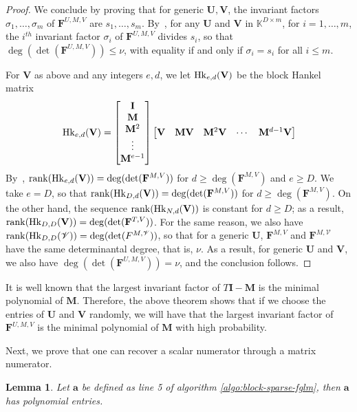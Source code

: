 \documentclass[12pt]{article}
\newtheorem{Lemma}{Lemma}
\def\K {\ensuremath{\mathbb{K}}}
\def\scrV {\ensuremath{\mathscr{V}}}
\def\K{\mathbb{K}}
\def\mF{\mathbf{F}}
\def\mI{\mathbf{I}}
\def\mM{\mathbf{M}}
\def\mU{\mathbf{U}}
\def\mV{\mathbf{V}}
\begin{document}
\begin{proof}
	We conclude by proving that for generic $\mU,\mV$, the invariant factors
	$\sigma_1,\dots,\sigma_m$ of $\mF^{U,M,V}$ are $s_1,\dots,s_m$.
	By~\cite[Theorem~2.12]{KaVi04}, for any $\mU$ and $\mV$ in $\K^{D\times
		m}$, for $i=1,\dots,m$, the $i^{th}$ invariant factor $\sigma_i$ of
	$\mF^{U,M,V}$ divides $s_i$, so that $\deg(\det(\mF^{U,M,V}))\le\nu$, with
	equality if and only if $\sigma_i=s_i$ for all $i \le m$.
	
	For $\mV$ as above and any integers $e,d$, we let ${\rm Hk}_{e,d}(\mV)$ be
	the block Hankel matrix
	$$ {\rm Hk}_{e,d}(\mV) =
	\begin{bmatrix}
	\mI \\  \mM \\  \mM^2 \\ \vdots  \\  \mM^{e-1}
	\end{bmatrix}
	\begin{bmatrix}
	\mV & \mM\mV & \mM^2\mV &\cdots&  \mM^{d-1}\mV
	\end{bmatrix}
	$$ By~\cite[Eq.~(2.6)]{KaVi04}, ${\rm rank}({\rm Hk}_{e,d}(\mV)) =
	\deg(\det(\mF^{M,V}))$ for $d \ge \deg(\mF^{M,V})$ and $e \ge D$.  We take
	$e=D$, so that ${\rm rank}({\rm Hk}_{D,d}(\mV)) = \deg(\det(\mF^{M,V}))$
	for $d \ge \deg(\mF^{M,V})$. On the other hand, the sequence ${\rm
		rank}({\rm Hk}_{N,d}(\mV))$ is constant for $d \ge D$; as a result,
	${\rm rank}({\rm Hk}_{D,D}(\mV)) = \deg(\det(\mF^{T,V}))$. For the same
	reason, we also have ${\rm rank}({\rm Hk}_{D,D}(\scrV)) =
	\deg(\det(F^{M,\scrV}))$, so that for a generic $\mU$, $\mF^{M,V}$ and
	$\mF^{M,\scrV}$ have the same determinantal degree, that is, $\nu$.  As
	a result, for generic $\mU$ and $\mV$, we also have
	$\deg(\det(\mF^{U,M,V}))=\nu$, and the conclusion follows.
\end{proof} 

It is well known that the largest invariant factor of
$T\mI - \mM$ is the minimal polynomial of $\mM$. Therefore, the above
theorem shows that if we choose the entries of $\mU$ and $\mV$
randomly, we will have that the
largest invariant factor of $\mF^{U,M,V}$ is the minimal
polynomial of $\mM	$  with high probability.

Next, we prove that one can recover a scalar numerator
through a matrix numerator.

\begin{Lemma}\label{utilde}
	Let $\textbf{a}$ be defined as line 5 of algorithm \ref{algo:block-sparse-fglm}, 
	then $\textbf{a}$ has polynomial entries.
\end{Lemma}
\end{document}
